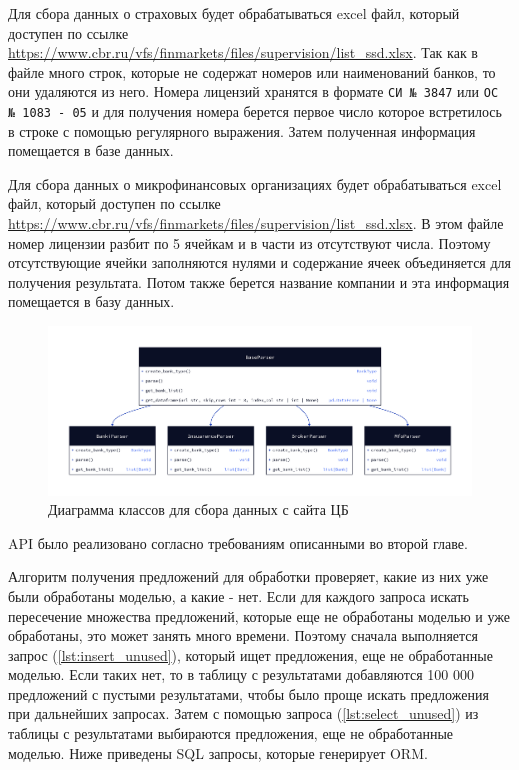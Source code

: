 \documentclass[PI, VKR]{HSEUniversity}
\begin{document}
Для сбора данных о страховых будет обрабатываться excel файл, который доступен по ссылке \url{https://www.cbr.ru/vfs/finmarkets/files/supervision/list\_ssd.xlsx}. Так как в файле много строк, которые не содержат номеров или наименований банков, то они удаляются из него. Номера лицензий хранятся в формате \texttt{СИ № 3847} или \texttt{ОС № 1083 - 05} и для получения номера берется первое число которое встретилось в строке с помощью регулярного выражения. Затем полученная информация помещается в базе данных.

Для сбора данных о микрофинансовых организациях будет обрабатываться excel файл, который доступен по ссылке \url{https://www.cbr.ru/vfs/finmarkets/files/supervision/list\_ssd.xlsx}. В этом файле номер лицензии разбит по 5 ячейкам и в части из отсутствуют числа. Поэтому отсутствующие ячейки заполняются нулями и содержание ячеек объединяется для получения результата. Потом также берется название компании и эта информация помещается в базу данных.

\begin{figure}[h!]
\centering
\includegraphics[width=\textwidth]{img/d2/cbr_parser_class.png}
\caption{\label{fig:cbr_parser_class}Диаграмма классов для сбора данных с сайта ЦБ}
\end{figure}

API было реализовано согласно требованиям описанными во второй главе.

Алгоритм получения предложений для обработки проверяет, какие из них уже были обработаны моделью, а какие - нет. Если для каждого запроса искать пересечение множества предложений, которые еще не обработаны моделью и уже обработаны, это может занять много времени. Поэтому сначала выполняется запрос (\ref{lst:insert_unused}), который ищет предложения, еще не обработанные моделью. Если таких нет, то в таблицу с результатами добавляются 100 000 предложений с пустыми результатами, чтобы было проще искать предложения при дальнейших запросах. Затем с помощью запроса (\ref{lst:select_unused}) из таблицы с результатами выбираются предложения, еще не обработанные моделью. Ниже приведены SQL запросы, которые генерирует ORM.
\end{document}
